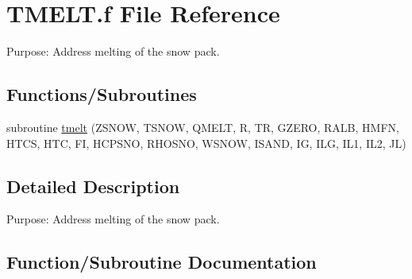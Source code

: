 \hypertarget{TMELT_8f}{}\section{T\+M\+E\+L\+T.\+f File Reference}
\label{TMELT_8f}


Purpose\+: Address melting of the snow pack.  


\subsection*{Functions/\+Subroutines}
\begin{DoxyCompactItemize}
\item 
subroutine \hyperlink{TMELT_8f_aad6f10137f2154cc02903988c6a60107}{tmelt} (Z\+S\+N\+O\+W, T\+S\+N\+O\+W, Q\+M\+E\+L\+T, R, T\+R, G\+Z\+E\+R\+O, R\+A\+L\+B, H\+M\+F\+N, H\+T\+C\+S, H\+T\+C, F\+I, H\+C\+P\+S\+N\+O, R\+H\+O\+S\+N\+O, W\+S\+N\+O\+W, I\+S\+A\+N\+D, I\+G, I\+L\+G, I\+L1, I\+L2, J\+L)
\end{DoxyCompactItemize}


\subsection{Detailed Description}
Purpose\+: Address melting of the snow pack. 



\subsection{Function/\+Subroutine Documentation}
\hypertarget{TMELT_8f_aad6f10137f2154cc02903988c6a60107}{}
